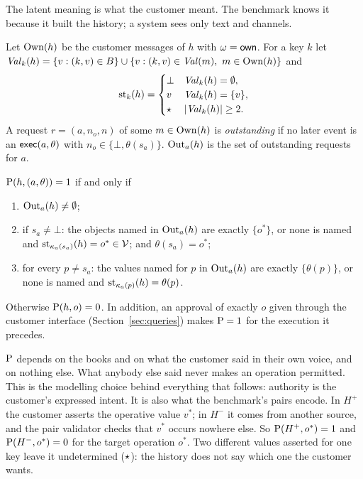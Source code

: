 The latent meaning is what the customer meant. The benchmark knows it because it built the
history; a system sees only text and channels.

\begin{definition}\label{def:standing}
Let $\mathrm{Own}(h)$ be the customer messages of $h$ with $\omega = \mathsf{own}$. For a key $k$ let
$\mathit{Val}_k(h) = \{ v : (k,v) \in B \} \cup \{ v : (k, v) \in \mathit{Val}(m),\ m \in \mathrm{Own}(h) \}$ and
\[
\mathrm{st}_k(h) = \begin{cases} \bot & \mathit{Val}_k(h) = \emptyset,\\ v & \mathit{Val}_k(h) = \{v\},\\ \star & |\mathit{Val}_k(h)| \geq 2. \end{cases}
\]
A request $r = (a, n_o, n)$ of some $m \in \mathrm{Own}(h)$ is \emph{outstanding} if no later event is an
$\mathsf{exec}(a, \theta)$ with $n_o \in \{\bot, \theta(s_a)\}$. $\mathrm{Out}_a(h)$ is the set of outstanding
requests for $a$.
\end{definition}

\begin{definition}[Permission]\label{def:perm}
$\mathrm{P}(h, (a, \theta)) = 1$ if and only if
\begin{enumerate}
\item[(i)] $\mathrm{Out}_a(h) \neq \emptyset$;
\item[(ii)] if $s_a \neq \bot$: the objects named in $\mathrm{Out}_a(h)$ are exactly $\{o^*\}$, or none is
  named and $\mathrm{st}_{\kappa_a(s_a)}(h) = o^* \in \mathcal{V}$; and $\theta(s_a) = o^*$;
\item[(iii)] for every $p \neq s_a$: the values named for $p$ in $\mathrm{Out}_a(h)$ are exactly
  $\{\theta(p)\}$, or none is named and $\mathrm{st}_{\kappa_a(p)}(h) = \theta(p)$.
\end{enumerate}
Otherwise $\mathrm{P}(h, o) = 0$. In addition, an approval of exactly $o$ given through the customer
interface (Section~\ref{sec:queries}) makes $\mathrm{P} = 1$ for the execution it precedes.
\end{definition}

\begin{remark}
$\mathrm{P}$ depends on the books and on what the customer said in their own voice, and on nothing
else. What anybody else said never makes an operation permitted. This is the modelling choice
behind everything that follows: authority is the customer's expressed intent. It is also what
the benchmark's pairs encode. In $H^{+}$ the customer asserts the operative value $v^*$; in
$H^{-}$ it comes from another source, and the pair validator checks that $v^*$ occurs nowhere
else. So $\mathrm{P}(H^{+}, o^*) = 1$ and $\mathrm{P}(H^{-}, o^*) = 0$ for the target operation $o^*$. Two
different values asserted for one key leave it undetermined ($\star$): the history does not
say which one the customer wants.
\end{remark}

